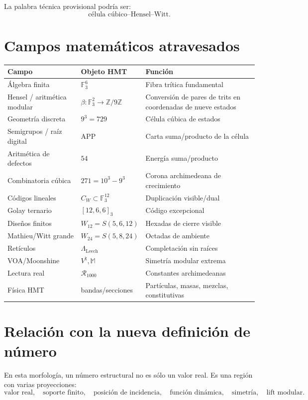 \documentclass[11pt,a4paper]{article}
\theoremstyle{definition}
\theoremstyle{remark}
\newcommand{\F}{\mathbb F}
\newcommand{\Z}{\mathbb Z}
\newcommand{\Leech}{\Lambda_{\mathrm{Leech}}}
\newcommand{\Vnat}{V^{\natural}}
\newcommand{\Monster}{\mathbb M}
\newcommand{\Rread}{\mathcal R_{1000}}
\begin{document}
La palabra técnica provisional podría ser:
\[
\boxed{
\text{célula cúbico--Hensel--Witt}.
}
\]

\section{Campos matemáticos atravesados}

\begin{longtable}{@{}p{3.2cm}p{4.1cm}p{6.4cm}@{}}
\toprule
Campo & Objeto HMT & Función \\
\midrule
Álgebra finita & \(\F_3^6\) & Fibra trítica fundamental \\
Hensel / aritmética modular & \(\beta:\F_3^2\to\Z/9\Z\) & Conversión de pares de trits en coordenadas de nueve estados \\
Geometría discreta & \(9^3=729\) & Célula cúbica de estados \\
Semigrupos / raíz digital & APP & Carta suma/producto de la célula \\
Aritmética de defectos & \(54\) & Energía suma/producto \\
Combinatoria cúbica & \(271=10^3-9^3\) & Corona archimedeana de crecimiento \\
Códigos lineales & \(C_W\subset\F_3^{12}\) & Duplicación visible/dual \\
Golay ternario & \([12,6,6]_3\) & Código excepcional \\
Diseños finitos & \(W_{12}=S(5,6,12)\) & Hexadas de cierre visible \\
Mathieu/Witt grande & \(W_{24}=S(5,8,24)\) & Octadas de ambiente \\
Retículos & \(\Leech\) & Completación sin raíces \\
VOA/Moonshine & \(\Vnat,\Monster\) & Simetría modular extrema \\
Lectura real & \(\Rread\) & Constantes archimedeanas \\
Física HMT & bandas/secciones & Partículas, masas, mezclas, constitutivas \\
\bottomrule
\end{longtable}

\section{Relación con la nueva definición de número}

En esta morfología, un número estructural no es sólo un valor real. Es una región con varias proyecciones:
\[
\text{valor real},
\quad
\text{soporte finito},
\quad
\text{posición de incidencia},
\quad
\text{función dinámica},
\quad
\text{simetría},
\quad
\text{lift modular}.
\]
\end{document}
